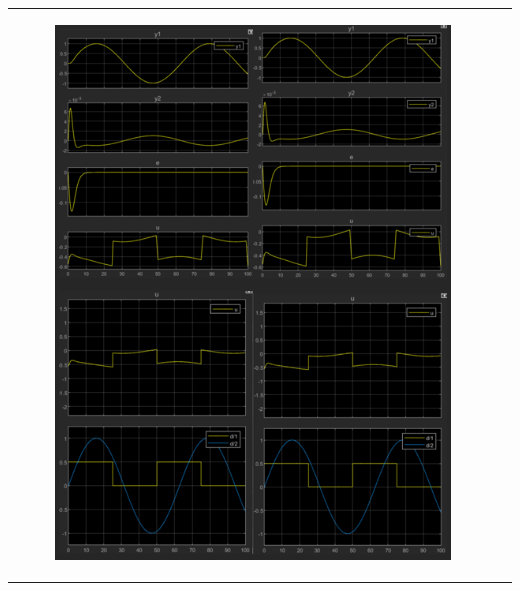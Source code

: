 \documentclass{beamer}
\begin{document}
\begin{frame}
\begin{tabular}{cc}
\begin{minipage}{0.45\textwidth}
\begin{figure}
				\includegraphics[scale=0.55]{2022-06-20-13-22-43.png}%
			\end{figure}
		\end{minipage}
	\end{tabular}
\end{frame}
\end{document}
